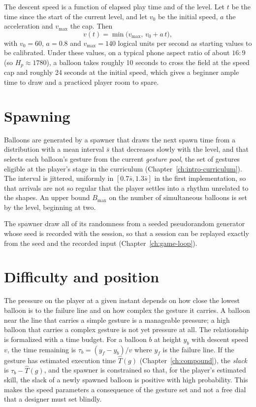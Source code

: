 The descent speed is a function of elapsed play time and of the level. Let $t$ be the time since the start of the current level, and let $v_0$ be the initial speed, $a$ the acceleration and $v_{\max}$ the cap. Then
\[
v(t)=\min\bigl(v_{\max},\,v_0+a\,t\bigr),
\]
with $v_0=60$, $a=0.8$ and $v_{\max}=140$ logical units per second as starting values to be calibrated.\evS{} Under these values, on a typical phone aspect ratio of about $16{:}9$ (so $H_p\approx1780$), a balloon takes roughly 10 seconds to cross the field at the speed cap and roughly 24 seconds at the initial speed, which gives a beginner ample time to draw and a practiced player room to spare.

\section{Spawning}

Balloons are generated by a spawner that draws the next spawn time from a distribution with a mean interval $\bar s$ that decreases slowly with the level, and that selects each balloon's gesture from the current \emph{gesture pool}, the set of gestures eligible at the player's stage in the curriculum (Chapter~\ref{ch:intro-curriculum}). The interval is jittered, uniformly in $[0.7\bar s,1.3\bar s]$ in the first implementation, so that arrivals are not so regular that the player settles into a rhythm unrelated to the shapes. An upper bound $B_{\max}$ on the number of simultaneous balloons is set by the level, beginning at two.

\begin{requirement}\label{req:spawn}
The spawner \must{} draw all of its randomness from a seeded pseudorandom generator whose seed is recorded with the session, so that a session can be replayed exactly from the seed and the recorded input (Chapter~\ref{ch:game-loop}).\evS
\end{requirement}

\section{Difficulty and position}

The pressure on the player at a given instant depends on how close the lowest balloon is to the failure line and on how complex the gesture it carries. A balloon near the line that carries a simple gesture is a manageable pressure; a high balloon that carries a complex gesture is not yet pressure at all. The relationship is formalized with a time budget. For a balloon $b$ at height $y_b$ with descent speed $v$, the time remaining is $\tau_b=(y_f-y_b)/v$ where $y_f$ is the failure line. If the gesture has estimated execution time $\hat T(g)$ (Chapter~\ref{ch:compound}), the \emph{slack} is $\tau_b-\hat T(g)$, and the spawner is constrained so that, for the player's estimated skill, the slack of a newly spawned balloon is positive with high probability. This makes the speed parameters a consequence of the gesture set and not a free dial that a designer must set blindly.


